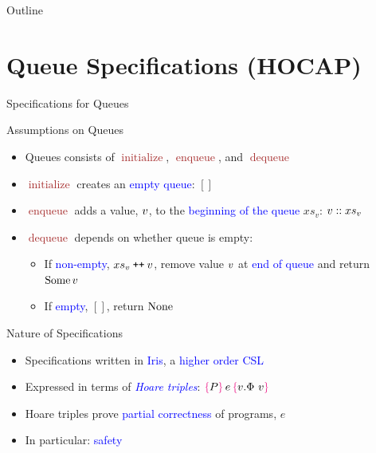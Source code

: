 \documentclass[9pt,xcolor={dvipsnames}]{beamer}
\newcommand{\initialise}{\operatorname{initialize}}
\newcommand{\enqueue}{\operatorname{enqueue}}
\newcommand{\dequeue}{\operatorname{dequeue}}
\newcommand{\absvalue}{\val}
\newcommand{\absvalueList}{xs_v}
\newcommand\catenate{\mathbin{\text{\ttfamily\upshape ++}}}
\begin{document}
\begin{frame}{Outline}
  \tableofcontents
\end{frame}


\section{Queue Specifications (HOCAP)}

\begin{frame}{Specifications for Queues}
  \begin{block}{Assumptions on Queues}
    \begin{itemize}
      \item Queues consists of \textcolor{Brown}{$\initialise$}, \textcolor{Brown}{$\enqueue$}, and \textcolor{Brown}{$\dequeue$}
      \item \textcolor{Brown}{$\initialise$} creates an \textcolor{blue}{empty queue}: $[]$
      \item \textcolor{Brown}{$\enqueue$} adds a value, $\absvalue$, to the \textcolor{blue}{beginning of the queue} $\absvalueList$: $\absvalue :: \absvalueList$
      \item \textcolor{Brown}{$\dequeue$} depends on whether queue is empty:
        \begin{itemize}
          \item If \textcolor{blue}{non-empty}, $\absvalueList \catenate \absvalue$, remove value $\absvalue$ at \textcolor{blue}{end of queue} and return \textcolor{blue}{$\Some \absvalue$}
          \item If \textcolor{blue}{empty}, $[]$, return \textcolor{blue}{$\operatorname{None}$}
        \end{itemize}
    \end{itemize}
  \end{block}
  \pause
  \begin{block}{Nature of Specifications}
    \begin{itemize}
      \item Specifications written in \textcolor{blue}{Iris}, a \textcolor{blue}{higher order CSL}
      \item Expressed in terms of \textcolor{blue}{\textit{Hoare triples}}: $\hoare{P}{e}{v. \Phi ~ v}$
      \item Hoare triples prove \textcolor{blue}{partial correctness} of programs, $e$
      \item In particular: \textcolor{blue}{safety}
    \end{itemize}
  \end{block}
\end{frame}
\end{document}
